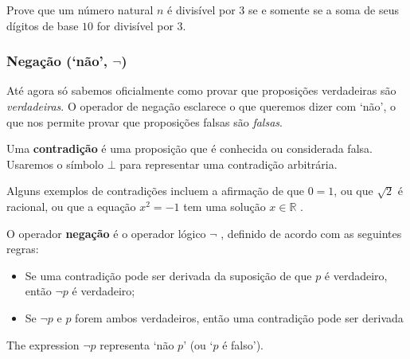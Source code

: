 \begin{itemizar}
\begin{exercise}
Prove que um número natural $n$ é divisível por $3$ se e somente se a soma de seus dígitos de base $10$ for divisível por $3$.
\end{exercise}

\subsubsection*{Negação (`não', $\neg$)}

Até agora só sabemos oficialmente como provar que proposições verdadeiras são \textit{verdadeiras}. O operador de negação esclarece o que queremos dizer com `não', o que nos permite provar que proposições falsas são \textit{falsas}.

\begin{definition}
\label{defContradiction}
Uma \textbf{contradição} é uma proposição que é conhecida ou considerada falsa. Usaremos o símbolo $\bot$  para representar uma contradição arbitrária.
\end{definition}

\begin{example}
Alguns exemplos de contradições incluem a afirmação de que $0=1$, ou que $\sqrt{2}$ é racional, ou que a equação $x^2=-1$ tem uma solução $x \in \mathbb{R}$ .
\end{example}

\begin{definition}
\label{defNegation}
O operador \textbf{negação} é o operador lógico $\neg$ , definido de acordo com as seguintes regras:
\begin{itemize}
\item \introrule{\neg} Se uma contradição pode ser derivada da suposição de que $p$ é verdadeiro, então $\neg p$ é verdadeiro;
\item \elimrule{\neg} Se $\neg p$ e $p$ forem ambos verdadeiros, então uma contradição pode ser derivada
\end{itemize}
The expression $\neg p$ representa `não $p$' (ou `$p$ é falso').
\end{definition}


\end{itemizar}
